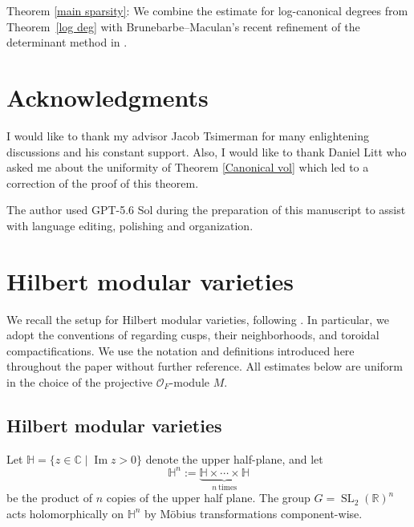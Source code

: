 \documentclass[12 pt]{amsart}
\theoremstyle{definition}
\newcommand{\C}{\mathbb{C}} %
\newcommand{\SL}{\operatorname{SL}}
\begin{document}
Theorem \ref{main sparsity}: We combine the estimate for log-canonical
degrees from Theorem~\ref{log deg} with Brunebarbe--Maculan's recent
refinement of the determinant method in \cite[Theorem 4.4]{brunebarbe2022counting}.




 
\section*{Acknowledgments}
I would like to thank my advisor Jacob Tsimerman
for many enlightening discussions and his constant support. Also, I would like to thank Daniel Litt who asked me about the uniformity of Theorem \ref{Canonical vol} which led to a correction of the proof of this theorem.  

The author used GPT-5.6 Sol during the preparation of this manuscript to assist with language editing, polishing and organization.

\section{Hilbert modular varieties}\label{Back}

We recall the setup for Hilbert modular varieties, following \cite[\S\S1 and~3]{bakker2018geometric}. In particular, we adopt the conventions of \cite[\S1]{bakker2018geometric} regarding cusps, their neighborhoods, and toroidal compactifications.  We use the notation and definitions introduced here throughout the paper without further reference.
All estimates below are uniform in the choice of the projective $\mathcal O_F$-module $M$.

\subsection{Hilbert modular varieties}\label{hilbert}
Let $\mathbb{H}=\{z\in\C\mid \operatorname{Im} z>0\}$ denote the upper half-plane, and let
\[\mathbb H^n:=\underbrace{\mathbb H\times\cdots\times\mathbb H}_{n \ \text{times}}\]
be the product of \(n\) copies of the upper half plane. The group \(G=\SL_2(\mathbb R)^n\) acts holomorphically on
\(\mathbb H^n\) by M\"obius transformations component-wise.
\end{document}
